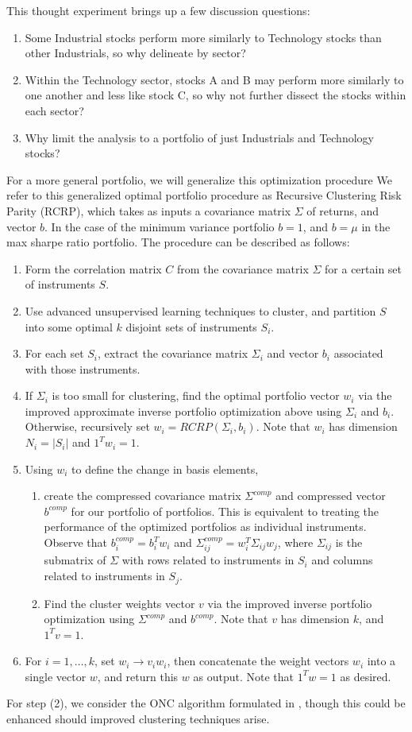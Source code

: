 \documentclass[10pt,twoside,titlepage]{article}   %
\begin{document}
This thought experiment brings up a few discussion questions:
\begin{enumerate}
\item Some Industrial stocks perform more similarly to Technology stocks than other Industrials, so why delineate by sector?
\item Within the Technology sector, stocks A and B may perform more similarly to one another and less like stock C, so why not further dissect the stocks within each sector?
\item Why limit the analysis to a portfolio of just Industrials and Technology stocks?
\end{enumerate}
For a more general portfolio, we will generalize this optimization procedure
We refer to this generalized optimal portfolio procedure as Recursive Clustering Risk Parity (RCRP), 
which takes as inputs a covariance matrix $\Sigma$ of returns, and vector $b$. 
In the case of the minimum variance portfolio $b=1$, and $b=\mu$ in the max sharpe ratio portfolio. 
The procedure can be described as follows:
\begin{enumerate}
\item Form the correlation matrix $C$ from the covariance matrix $\Sigma$ for a certain set of instruments $S$.
\item Use advanced unsupervised learning techniques to cluster, and partition $S$ into some optimal $k$ disjoint sets of instruments $S_i$.
\item For each set $S_i$, extract the covariance matrix $\Sigma_i$ and vector $b_i$ associated with those instruments.
\item If $\Sigma_i$ is too small for clustering, find the optimal portfolio vector $w_i$ via the improved approximate inverse portfolio optimization above using $\Sigma_i$ and $b_i$.
Otherwise, recursively set $w_i = RCRP( \Sigma_i, b_i )$. 
Note that $w_i$ has dimension $N_i=|S_i|$ and $1^T w_i = 1$.
\item Using $w_i$ to define the change in basis elements, 
\begin{enumerate}
\item create the compressed covariance matrix $\Sigma^{comp}$ and compressed vector $b^{comp}$ for our portfolio of portfolios. 
This is equivalent to treating the performance of the optimized portfolios as individual instruments. 
Observe that $b_i^{comp}=b_i^T w_i$ and $\Sigma_{ij}^{comp} = w_i^T\Sigma_{ij} w_j$, where $\Sigma_{ij}$ is the submatrix of $\Sigma$ with rows related to instruments in $S_i$ and columns related to instruments in $S_j$.
\item Find the cluster weights vector $v$ via the improved inverse portfolio optimization using $\Sigma^{comp}$ and $b^{comp}$. 
Note that $v$ has dimension $k$, and $1^T v = 1$.
\end{enumerate}
\item For $i = 1, \ldots, k$, set $w_i \to v_i w_i$, then concatenate the weight vectors $w_i$ into a single vector $w$, and return this $w$ as output. Note that $1^Tw=1$ as desired.
\end{enumerate}
For step (2), we consider the ONC algorithm formulated in \cite{LopezAndLewis}, 
though this could be enhanced should improved clustering techniques arise.
\end{document}
